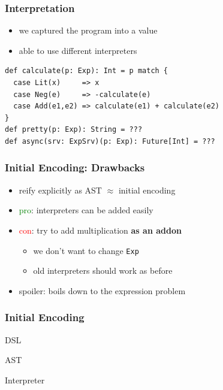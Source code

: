 \documentclass{beamer}
\begin{document}
\begin{frame}[fragile]
  \frametitle{Interpretation}
  \begin{itemize}
  \item we captured the program into a value
  \item able to use different interpreters
  \end{itemize}
\begin{verbatim}
def calculate(p: Exp): Int = p match {
  case Lit(x)     => x
  case Neg(e)     => -calculate(e)
  case Add(e1,e2) => calculate(e1) + calculate(e2)
}
def pretty(p: Exp): String = ???
def async(srv: ExpSrv)(p: Exp): Future[Int] = ???
\end{verbatim}
\end{frame}

\begin{frame}
  \frametitle{Initial Encoding: Drawbacks}
  \begin{itemize}
  \item reify explicitly as AST $\approx{}$ initial encoding
  \item \textcolor{green}{pro}: interpreters can be added easily
  \item \textcolor{red}{con}: try to add multiplication \textbf{as an
      addon}
    \begin{itemize}
    \item we don't want to change \texttt{Exp}
    \item old interpreters should work as before
    \end{itemize}
  \item spoiler: boils down to the expression problem
  \end{itemize}
\end{frame}

\begin{frame}
  \frametitle{Initial Encoding}
  \begin{center}
    \Huge
    DSL
  \end{center}
  \begin{center}
    \Huge
    AST
  \end{center}
  \begin{center}
    \Huge
    Interpreter
  \end{center}
\end{frame}
\end{document}
